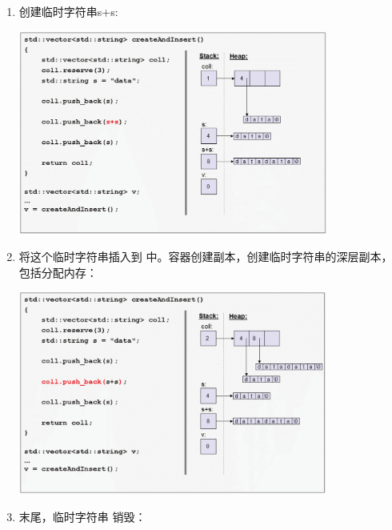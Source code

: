 \begin{itemize}
	\begin{enumerate}
		\item 创建临时字符串s+s:

		\begin{center}
			\includegraphics[width=0.8\textwidth]{part1/ch1/images/3}
		\end{center}
		\item 将这个临时字符串插入到  中。容器创建副本，创建临时字符串的深层副本，包括分配内存：

		\begin{center}
			\includegraphics[width=0.8\textwidth]{part1/ch1/images/4}
		\end{center}
		\item 末尾，临时字符串  销毁：


\end{enumerate}
\end{itemize}
